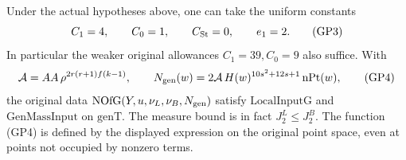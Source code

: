 \begin{theorem}
\label{thm:flag-generic-pinned-input}
Under the actual hypotheses above, one can take the uniform
constants
\[
                   C_1=4,\qquad C_0=1,\qquad C_{\rm St}=0,
                   \qquad e_1=2.                      \tag{GP3}
\]
In particular the weaker original allowances \(C_1=39,C_0=9\)
also suffice. With
\[
 {\cal A}=AA\,\rho^{2r(r+1)f(k-1)},\qquad
 N_{\rm gen}(w)=2{\cal A}\,
             H(w)^{10s^2+12s+1}\,\mathrm{nPt}(w),        \tag{GP4}
\]
the original data \(\mathrm{NOfG}(Y,u,\nu_L,\nu_B,N_{\rm gen})\)
satisfy \(\mathrm{LocalInputG}\) and \(\mathrm{GenMassInput}\)
on \(\mathrm{genT}\). The measure bound is in fact
\(J_2^L\le J_2^B\). The function (GP4) is defined by the
displayed expression on the original point space, even
at points not occupied by nonzero terms.
\end{theorem}
